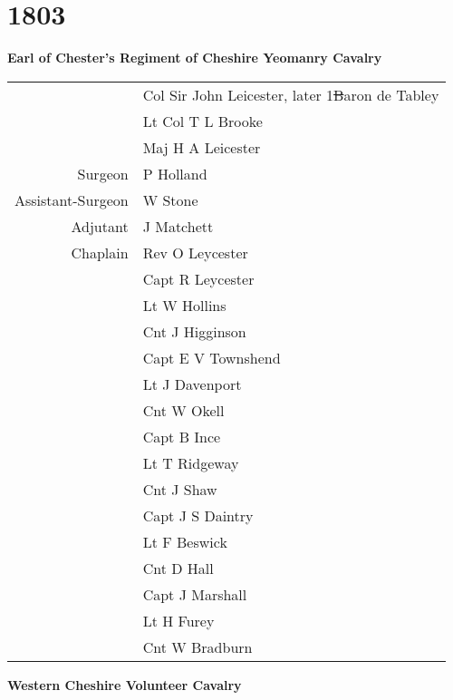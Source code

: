 \chapter*{1803}

\begin{center}
  \Large
  \textbf{Earl of Chester's Regiment of Cheshire Yeomanry Cavalry}
\end{center}

\begin{center}
  \begin{tabular}{rl}
    & Col Sir John Leicester, later 1\st Baron de Tabley \\
    & Lt Col T L Brooke \\
    & Maj H A Leicester \\
    Surgeon & P Holland \\
    Assistant-Surgeon & W Stone \\
    Adjutant & J Matchett \\
    Chaplain & Rev O Leycester \\
    & Capt R Leycester \\
    & Lt W Hollins \\
    & Cnt J Higginson \\
    & Capt E V Townshend \\
    & Lt J Davenport \\
    & Cnt W Okell \\
    & Capt B Ince \\
    & Lt T Ridgeway \\
    & Cnt J Shaw \\
    & Capt J S Daintry \\
    & Lt F Beswick \\
    & Cnt D Hall \\
    & Capt J Marshall \\
    & Lt H Furey \\
    & Cnt W Bradburn \\
  \end{tabular}
\end{center}

\begin{center}
  \Large
  \textbf{Western Cheshire Volunteer Cavalry}
\end{center}

